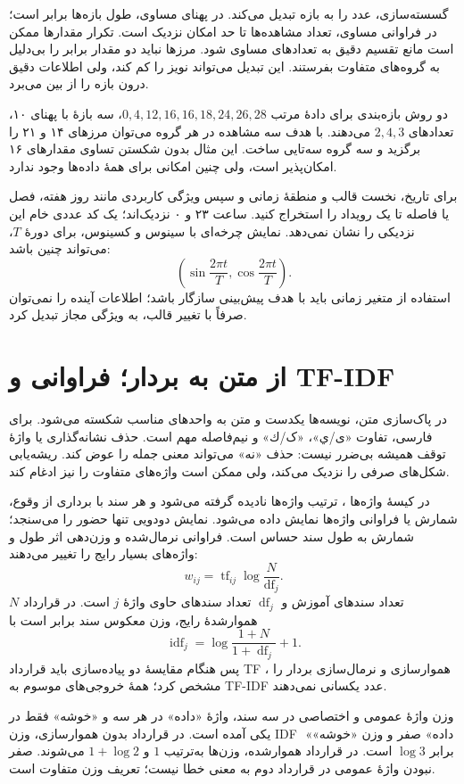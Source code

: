 گسسته‌سازی، عدد را به بازه تبدیل می‌کند. در پهنای مساوی، طول بازه‌ها برابر است؛ در فراوانی مساوی، تعداد مشاهده‌ها تا حد امکان نزدیک است. تکرار مقدارها ممکن است مانع تقسیم دقیق به تعدادهای مساوی شود. مرزها نباید دو مقدار برابر را بی‌دلیل به گروه‌های متفاوت بفرستند. این تبدیل می‌تواند نویز را کم کند، ولی اطلاعات دقیق درون بازه را از بین می‌برد.

\begin{example}{دو روش بازه‌بندی}
برای دادهٔ مرتب $0,4,12,16,16,18,24,26,28$، سه بازهٔ با پهنای ۱۰، تعدادهای $2,4,3$ می‌دهند. با هدف سه مشاهده در هر گروه می‌توان مرزهای ۱۴ و ۲۱ را برگزید و سه گروه سه‌تایی ساخت. این مثال بدون شکستن تساوی مقدارهای ۱۶ امکان‌پذیر است، ولی چنین امکانی برای همهٔ داده‌ها وجود ندارد.
\end{example}

برای تاریخ، نخست قالب و منطقهٔ زمانی و سپس ویژگی کاربردی مانند روز هفته، فصل یا فاصله تا یک رویداد را استخراج کنید. ساعت ۲۳ و ۰ نزدیک‌اند؛ یک کد عددی خام این نزدیکی را نشان نمی‌دهد. نمایش چرخه‌ای با سینوس و کسینوس، برای دورهٔ $T$، می‌تواند چنین باشد:
\[\left(\sin\frac{2\pi t}{T},\cos\frac{2\pi t}{T}\right).\]
استفاده از متغیر زمانی باید با هدف پیش‌بینی سازگار باشد؛ اطلاعات آینده را نمی‌توان صرفاً با تغییر قالب، به ویژگی مجاز تبدیل کرد.

\section{از متن به بردار؛ فراوانی و TF-IDF}
در پاک‌سازی متن، نویسه‌ها یکدست و متن به واحدهای مناسب شکسته می‌شود. برای فارسی، تفاوت «ی/ي»، «ک/ك» و نیم‌فاصله مهم است. حذف نشانه‌گذاری یا واژهٔ توقف همیشه بی‌ضرر نیست: حذف «نه» می‌تواند معنی جمله را عوض کند. ریشه‌یابی شکل‌های صرفی را نزدیک می‌کند، ولی ممکن است واژه‌های متفاوت را نیز ادغام کند.

در کیسهٔ واژه‌ها ، ترتیب واژه‌ها نادیده گرفته می‌شود و هر سند با برداری از وقوع، شمارش یا فراوانی واژه‌ها نمایش داده می‌شود. نمایش دودویی تنها حضور را می‌سنجد؛ شمارش به طول سند حساس است. فراوانی نرمال‌شده و وزن‌دهی  اثر طول و واژه‌های بسیار رایج را تغییر می‌دهند:
\[w_{ij}=\operatorname{tf}_{ij}\log\frac{N}{\operatorname{df}_j}.\]
$N$ تعداد سندهای آموزش و $\operatorname{df}_j$ تعداد سندهای حاوی واژهٔ $j$ است. در قرارداد هموارشدهٔ رایج، وزن معکوس سند برابر است با
\[\operatorname{idf}_j=\log\frac{1+N}{1+\operatorname{df}_j}+1.\]
پس هنگام مقایسهٔ دو پیاده‌سازی باید قرارداد TF ، هموارسازی و نرمال‌سازی بردار را مشخص کرد؛ همهٔ خروجی‌های موسوم به TF-IDF عدد یکسانی نمی‌دهند.

\begin{example}{وزن واژهٔ عمومی و اختصاصی}
در سه سند، واژهٔ «داده» در هر سه و «خوشه» فقط در یکی آمده است. در قرارداد بدون هموارسازی، وزن IDF ِ «داده» صفر و وزن «خوشه» برابر $\log3$ است. در قرارداد هموارشده، وزن‌ها به‌ترتیب $1$ و $1+\log2$ می‌شوند. صفر نبودن واژهٔ عمومی در قرارداد دوم به معنی خطا نیست؛ تعریف وزن متفاوت است.
\end{example}

